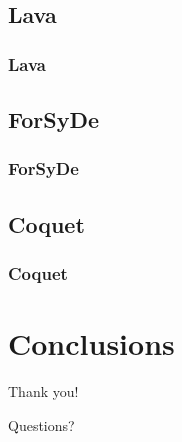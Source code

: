 \documentclass{beamer}
\begin{document}
        \subsection{Lava}
        \label{subsec:lava}
            \begin{frame}
                \frametitle{Lava}
            \end{frame}

        \subsection{ForSyDe}
        \label{subsec:forsyde}
            \begin{frame}
                \frametitle{ForSyDe}
            \end{frame}

        \subsection{Coquet}
        \label{subsec:coquet}
            \begin{frame}
                \frametitle{Coquet}
            \end{frame}


    \section{Conclusions}
    \label{sec:conclusions}
        \frame{\sectionpage}

        \begin{frame}[plain]
            \begin{center}
                \par{\Huge{Thank you!}}
                \vspace{2.0cm}
                \par{\Huge{Questions?}}
            \end{center}
        \end{frame}
\end{document}
